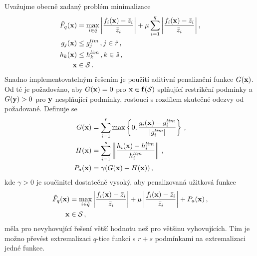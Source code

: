 
Uvažujme obecně zadaný problém minimalizace
\begin{align}
	\tilde{F}_q (\mathbf{x}) &= \operatorname*{max}\limits_{i\in\hat{q}} \bigg|\frac{f_i (\mathbf{x}) - \bar{z}_i}{\bar{z}_i}\bigg| + \mu \sum_{i=1}^q \bigg|\frac{f_i (\mathbf{x}) - \bar{z}_i}{\bar{z}_i}\bigg|\,,\\
	g_j (\mathbf{x}) &\leq g_{j}^{lim}\,, j \in\hat{r}\,,\\
	h_k (\mathbf{x}) &\leq h_{k}^{lim}\,, k \in\hat{s}\,,\\
	\mathbf{x}&\in\mathcal{S}\,.
\end{align}
Snadno implementovatelným řešením je použití aditivní penalizační funkce $G(\mathbf{x})$. Od té je požadováno, aby $G(\mathbf{x})=0$ pro $\mathbf{x}\in \mathbf{f}(\mathcal{S})$ 
splňující restrikční podmínky a $G(\mathbf{y})>0$ pro $\mathbf{y}$ nesplňující podmínky, rostoucí s rozdílem skutečné odezvy od požadované. Definuje se
\begin{align}
	G(\mathbf{x}) &= \sum_{i=1}^r \mathrm{max}\left\{0, \frac{g_i (\mathbf{x})-g_{i}^{lim}}{|g_{i}^{lim}|} \right\}\,,\\
	H(\mathbf{x}) &= \sum_{i=1}^s \left\|\frac{h_i (\mathbf{x})-h_{i}^{lim}}{h_{i}^{lim}} \right\|\,,\\
	P_a (\mathbf{x}) &= \gamma(G(\mathbf{x}) + H(\mathbf{x}))\,,
\end{align}
kde $\gamma>0$ je součinitel dostatečně vysoký, aby penalizovaná užitková funkce 
\begin{align}
	\tilde{F}_q (\mathbf{x}) &= \operatorname*{max}\limits_{i\in\hat{q}} \left|\frac{f_i (\mathbf{x}) - \bar{z}_i}{\bar{z}_i}\right| + \mu \left|\frac{f_i (\mathbf{x}) - \bar{z}_i}{\bar{z}_i}\right| + P_a (\mathbf{x})\,,\\
	\mathbf{x}&\in\mathcal{S}\,,
\end{align}
měla pro nevyhovující řešení větší hodnotu než pro většinu vyhovujících. Tím je možno převést extremalizaci $q$-tice funkcí s $r+s$ podmínkami na 
extremalizaci jedné funkce. 


